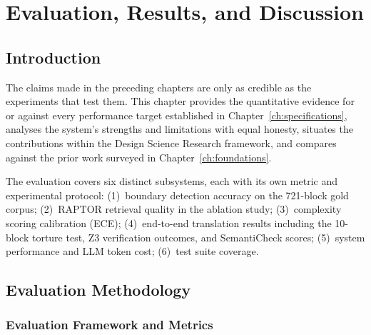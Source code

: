 
\chapter{Evaluation, Results, and Discussion}
\label{ch:evaluation}

\section{Introduction}
\label{sec:ch7-intro}

The claims made in the preceding chapters are only as credible as the
experiments that test them. This chapter provides the quantitative evidence for
or against every performance target established in
Chapter~\ref{ch:specifications}, analyses the system's strengths and limitations
with equal honesty, situates the contributions within the Design Science Research
framework, and compares \codara{} against the prior work surveyed in
Chapter~\ref{ch:foundations}.

The evaluation covers six distinct subsystems, each with its own metric and
experimental protocol:
(1)~boundary detection accuracy on the 721-block gold corpus;
(2)~RAPTOR retrieval quality in the ablation study;
(3)~complexity scoring calibration (ECE);
(4)~end-to-end translation results including the 10-block torture test,
Z3 verification outcomes, and SemantiCheck scores;
(5)~system performance and LLM token cost;
(6)~test suite coverage.

\section{Evaluation Methodology}
\label{sec:eval-methodology}

\subsection{Evaluation Framework and Metrics}
\label{subsec:metrics}

